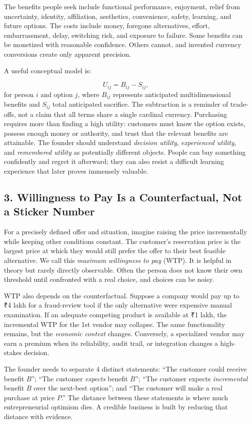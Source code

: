 The benefits people seek include functional performance, enjoyment, relief from uncertainty, identity, affiliation, aesthetics, convenience, safety, learning, and future options. The costs include money, foregone alternatives, effort, embarrassment, delay, switching risk, and exposure to failure. Some benefits can be monetized with reasonable confidence. Others cannot, and invented currency conversions create only apparent precision.

A useful conceptual model is:

\begin{equation}
U_{ij} = B_{ij} - S_{ij},
\end{equation}
for person $i$ and option $j$, where $B_{ij}$ represents anticipated multidimensional benefits and $S_{ij}$ total anticipated sacrifice. The subtraction is a reminder of trade-offs, not a claim that all terms share a single cardinal currency. Purchasing requires more than finding a high utility: customers must know the option exists, possess enough money or authority, and trust that the relevant benefits are attainable. The founder should understand \emph{decision utility}, \emph{experienced utility}, and \emph{remembered utility} as potentially different objects. People can buy something confidently and regret it afterward; they can also resist a difficult learning experience that later proves immensely valuable.

\subsection*{3. Willingness to Pay Is a Counterfactual, Not a Sticker Number}

For a precisely defined offer and situation, imagine raising the price incrementally while keeping other conditions constant. The customer's reservation price is the largest price at which they would still prefer the offer to their best feasible alternative. We call this \emph{maximum willingness to pay} (WTP). It is helpful in theory but rarely directly observable. Often the person does not know their own threshold until confronted with a real choice, and choices can be noisy.

WTP also depends on the counterfactual. Suppose a company would pay up to ₹4 lakh for a fraud-review tool if the only alternative were expensive manual examination. If an adequate competing product is available at ₹1 lakh, the incremental WTP for the 1st vendor may collapse. The same functionality remains, but the \emph{economic context} changes. Conversely, a specialized vendor may earn a premium when its reliability, audit trail, or integration changes a high-stakes decision.

The founder needs to separate 4 distinct statements: ``The customer could receive benefit $B$''; ``The customer \emph{expects} benefit $B$''; ``The customer expects \emph{incremental} benefit $B$ over the next-best option''; and ``The customer will make a real purchase at price $P$.'' The distance between these statements is where much entrepreneurial optimism dies. A credible business is built by reducing that distance with evidence.
